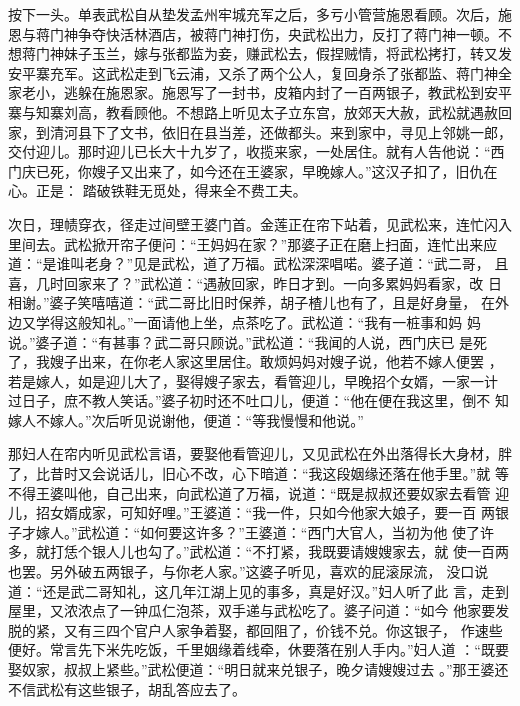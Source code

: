 按下一头。单表武松自从垫发孟州牢城充军之后，多亏小管营施恩看顾。次后，施
恩与蒋门神争夺快活林酒店，被蒋门神打伤，央武松出力，反打了蒋门神一顿。不
想蒋门神妹子玉兰，嫁与张都监为妾，赚武松去，假捏贼情，将武松拷打，转又发
安平寨充军。这武松走到飞云浦，又杀了两个公人，复回身杀了张都监、蒋门神全
家老小，逃躲在施恩家。施恩写了一封书，皮箱内封了一百两银子，教武松到安平
寨与知寨刘高，教看顾他。不想路上听见太子立东宫，放郊天大赦，武松就遇赦回
家，到清河县下了文书，依旧在县当差，还做都头。来到家中，寻见上邻姚一郎，
交付迎儿。那时迎儿已长大十九岁了，收揽来家，一处居住。就有人告他说：“西
门庆已死，你嫂子又出来了，如今还在王婆家，早晚嫁人。”这汉子扣了，旧仇在
心。正是：
踏破铁鞋无觅处，得来全不费工夫。

次日，理帻穿衣，径走过间壁王婆门首。金莲正在帘下站着，见武松来，连忙闪入
里间去。武松掀开帘子便问：“王妈妈在家？”那婆子正在磨上扫面，连忙出来应
道：“是谁叫老身？”见是武松，道了万福。武松深深唱喏。婆子道：“武二哥，
且喜，几时回家来了？”武松道：“遇赦回家，昨日才到。一向多累妈妈看家，改
日相谢。”婆子笑嘻嘻道：“武二哥比旧时保养，胡子楂儿也有了，且是好身量，
在外边又学得这般知礼。”一面请他上坐，点茶吃了。武松道：“我有一桩事和妈
妈说。”婆子道：“有甚事？武二哥只顾说。”武松道：“我闻的人说，西门庆已
是死了，我嫂子出来，在你老人家这里居住。敢烦妈妈对嫂子说，他若不嫁人便罢
，若是嫁人，如是迎儿大了，娶得嫂子家去，看管迎儿，早晚招个女婿，一家一计
过日子，庶不教人笑话。”婆子初时还不吐口儿，便道：“他在便在我这里，倒不
知嫁人不嫁人。”次后听见说谢他，便道：“等我慢慢和他说。”

那妇人在帘内听见武松言语，要娶他看管迎儿，又见武松在外出落得长大身材，胖
了，比昔时又会说话儿，旧心不改，心下暗道：“我这段姻缘还落在他手里。”就
等不得王婆叫他，自己出来，向武松道了万福，说道：“既是叔叔还要奴家去看管
迎儿，招女婿成家，可知好哩。”王婆道：“我一件，只如今他家大娘子，要一百
两银子才嫁人。”武松道：“如何要这许多？”王婆道：“西门大官人，当初为他
使了许多，就打恁个银人儿也勾了。”武松道：“不打紧，我既要请嫂嫂家去，就
使一百两也罢。另外破五两银子，与你老人家。”这婆子听见，喜欢的屁滚尿流，
没口说道：“还是武二哥知礼，这几年江湖上见的事多，真是好汉。”妇人听了此
言，走到屋里，又浓浓点了一钟瓜仁泡茶，双手递与武松吃了。婆子问道：“如今
他家要发脱的紧，又有三四个官户人家争着娶，都回阻了，价钱不兑。你这银子，
作速些便好。常言先下米先吃饭，千里姻缘着线牵，休要落在别人手内。”妇人道
：“既要娶奴家，叔叔上紧些。”武松便道：“明日就来兑银子，晚夕请嫂嫂过去
。”那王婆还不信武松有这些银子，胡乱答应去了。

